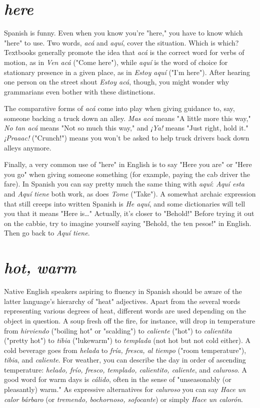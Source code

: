 \section{\emph{here}}

Spanish is funny. Even when you know you're "here," you
have to know which "here" to use. Two words, \emph{acá} and \emph{aquí}, cover
the situation. Which is which? Textbooks generally promote the idea
that \emph{acá} is the correct word for verbs of motion, as in \emph{Ven acá} ("Come
here"), while \emph{aquí} is the word of choice for stationary presence in a
given place, as in \emph{Estoy aquí} ("I'm here"). After hearing one person on
the street shout \emph{Estoy acá}, though, you might wonder why grammarians even bother with these distinctions.

The comparative forms of \emph{acá} come into play when giving
guidance to, say, someone backing a truck down an alley. \emph{Mas acá}
means "A little more this way," \emph{No tan acá} means "Not so much this
way," and \emph{¡Ya!} means "Just right, hold it." \emph{¡Praaac!} ("Crunch!") means
you won't be asked to help truck drivers back down alleys anymore.

Finally, a very common use of "here" in English is to say
"Here you are" or "Here you go" when giving someone something (for
example, paying the cab driver the fare). In Spanish you can say pretty
much the same thing with \emph{aquí}: \emph{Aquí esta} and \emph{Aquí tiene} both work,
as does \emph{Tome} ("Take"). A somewhat archaic expression that still creeps
into written Spanish is \emph{He aquí}, and some dictionaries will tell you
that it means "Here is\ldots{}" Actually, it's closer to "Behold!" Before
trying it out on the cabbie, try to imagine yourself saying "Behold, the
ten pesos!" in English. Then go back to \emph{Aquí tiene}.

\section{\emph{hot, warm}}

Native English speakers aspiring to fluency in Spanish should
be aware of the latter language's hierarchy of "heat" adjectives. Apart
from the several words representing various degrees of heat, different
words are used depending on the object in question. A soup fresh off
the fire, for instance, will drop in temperature from \emph{hirviendo} ("boiling
hot" or "scalding") to \emph{caliente} ("hot") to \emph{calientita} ("pretty hot") to
\emph{tibia} ("lukewarm") to \emph{templada} (not hot but not cold either). A cold
beverage goes from \emph{helada} to \emph{fría, fresca, al tiempo} ("room temperature"), \emph{tibia}, and \emph{caliente}. For weather, you can describe the day in order of ascending temperature: \emph{helado, frío, fresco, templado, calientito, caliente}, and \emph{caluroso}. A good word for warm days is \emph{cálido}, often
in the sense of "unseasonably (or pleasantly) warm." As expressive alternatives for \emph{caluroso} you can say \emph{Hace un calor bárbaro} (or \emph{tremendo, bochornoso, sofocante}) or simply \emph{Hace un calorón}.

